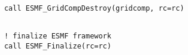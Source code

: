  \begin{verbatim}
      call ESMF_GridCompDestroy(gridcomp, rc=rc)
 
\end{verbatim}
 

 \begin{verbatim}
      ! finalize ESMF framework
      call ESMF_Finalize(rc=rc)
 
\end{verbatim}

\setlength{\parskip}{\oldparskip}
\setlength{\parindent}{\oldparindent}
\setlength{\baselineskip}{\oldbaselineskip}
